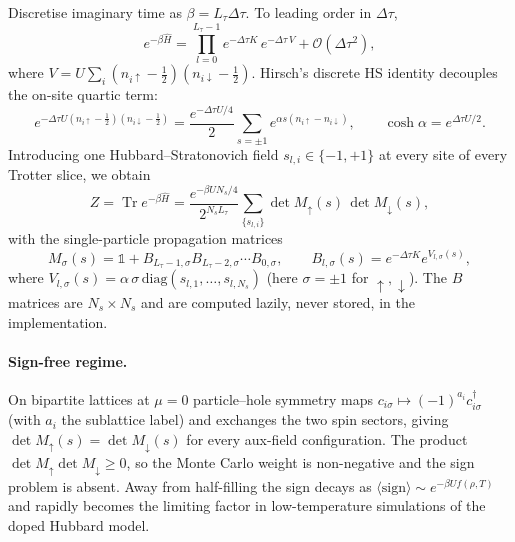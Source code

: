 \documentclass[11pt,a4paper]{article}
\renewcommand{\Tr}{\operatorname{Tr}}
\newcommand{\Hop}{\hat H}
\newcommand{\Bm}[2]{B_{#1,#2}}
\newcommand{\Ns}{N_{s}}
\newcommand{\Lt}{L_\tau}
\newcommand{\dt}{\Delta\tau}
\theoremstyle{plain}
\begin{document}
Discretise imaginary time as \(\beta = \Lt \dt\). To leading order
in \(\dt\),
\begin{equation}
e^{-\beta \Hop} = \prod_{l = 0}^{\Lt - 1}
   e^{-\dt K} \, e^{-\dt \, V} + \mathcal{O}(\dt^2),
\label{eq:trotter}
\end{equation}
where \(V = U\sum_i (n_{i\uparrow}-\tfrac12)(n_{i\downarrow}-\tfrac12)\).
Hirsch's discrete HS identity decouples the on-site quartic term:
\begin{equation}
e^{-\dt U (n_{i\uparrow}-\tfrac12)(n_{i\downarrow}-\tfrac12)}
   = \frac{e^{-\dt U/4}}{2}
     \sum_{s = \pm 1} e^{\alpha s (n_{i\uparrow} - n_{i\downarrow})},
\qquad \cosh \alpha = e^{\dt U / 2}.
\label{eq:HS}
\end{equation}
Introducing one Hubbard--Stratonovich field \(s_{l,i}\in\{-1,+1\}\) at
every site of every Trotter slice, we obtain
\begin{equation}
Z = \Tr e^{-\beta\Hop}
  = \frac{e^{-\beta U \Ns / 4}}{2^{\Ns \Lt}}
    \sum_{\{s_{l,i}\}}
    \det M_{\uparrow}(s) \, \det M_{\downarrow}(s),
\label{eq:Z}
\end{equation}
with the single-particle propagation matrices
\begin{equation}
M_\sigma(s) = \mathbb{1}
            + \Bm{\Lt-1}{\sigma} \Bm{\Lt-2}{\sigma} \cdots \Bm{0}{\sigma},
\qquad
\Bm{l}{\sigma}(s) = e^{-\dt K} e^{V_{l,\sigma}(s)},
\label{eq:Bdef}
\end{equation}
where \(V_{l,\sigma}(s) = \alpha\,\sigma\,\mathrm{diag}(s_{l,1},\ldots,s_{l,\Ns})\)
(here \(\sigma=\pm 1\) for \(\uparrow,\downarrow\)). The \(B\) matrices
are \(\Ns\times\Ns\) and are computed lazily, never stored, in the
implementation.

\paragraph{Sign-free regime.}
On bipartite lattices at \(\mu=0\) particle--hole symmetry maps
\(c_{i\sigma} \mapsto (-1)^{a_i} c^{\dagger}_{i\sigma}\) (with
\(a_i\) the sublattice label) and exchanges the two spin sectors,
giving \(\det M_\uparrow(s) = \det M_\downarrow(s)\) for every aux-field
configuration. The product \(\det M_\uparrow \det M_\downarrow \ge 0\),
so the Monte Carlo weight is non-negative and the sign problem is
absent. Away from half-filling the sign decays as
\(\langle\mathrm{sign}\rangle \sim e^{-\beta U f(\rho,T)}\) and rapidly
becomes the limiting factor in low-temperature simulations of the doped
Hubbard model.
\end{document}
